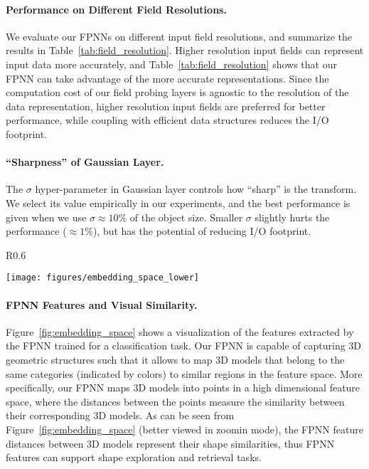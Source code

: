 \documentclass{article}
\begin{document}
\paragraph{Performance on Different Field Resolutions.}
We evaluate our FPNNs on different input field resolutions, and summarize the results in Table~\ref{tab:field_resolution}. Higher resolution input fields can represent input data more accurately, and Table~\ref{tab:field_resolution} shows that our FPNN can take advantage of the more accurate representations. Since the computation cost of our field probing layers is agnostic to the resolution of the data representation, higher resolution input fields are preferred for better performance, while coupling with efficient data structures reduces the I/O footprint.

\paragraph{``Sharpness'' of Gaussian Layer.} The $\sigma$ hyper-parameter in Gaussian layer controls how ``sharp'' is the transform. We select its value empirically in our experiments, and the best performance is given when we use $\sigma \approx 10\%$ of the object size. Smaller $\sigma$ slightly hurts the performance ($\approx 1\%$), but has the potential of reducing I/O footprint.

\begin{wrapfigure}{R}{0.6\linewidth}
	\vspace{-1.5cm}
	\begin{center}
		\texttt{[image: figures/embedding\_space\_lower]}
	\end{center}
	\vspace{-0.5cm}
	\caption{t-SNE visualization of FPNN features.}
	\label{fig:embedding_space}
	\vspace{-0.4cm}
\end{wrapfigure}

\paragraph{FPNN Features and Visual Similarity.} Figure~\ref{fig:embedding_space} shows a visualization of the features extracted by the FPNN trained for a classification task. Our FPNN is capable of capturing 3D geometric structures such that it allows to map 3D models that belong to the same categories (indicated by colors) to similar regions in the feature space. More specifically, our FPNN maps 3D models into points in a high dimensional feature space, where the distances between the points measure the similarity between their corresponding 3D models. As can be seen from Figure~\ref{fig:embedding_space} (better viewed in zoomin mode),  the FPNN feature distances between 3D models represent their shape similarities, thus FPNN features can support shape exploration and retrieval tasks.
\end{document}
